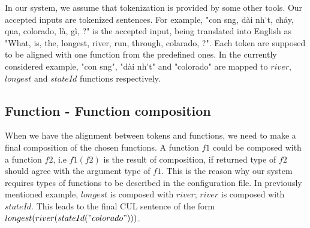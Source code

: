 In our system, we assume that tokenization is provided by some other tools. Our accepted inputs are tokenized sentences. For example, "{\selectfont con s\ocircumflex ng, d\`ai nh\'\acircumflex t, ch\h{a}y, qua, colorado, l\`a, g\`i, ?}" is the accepted input, being translated into English as "What, is, the, longest, river, run, through, colarado, ?". Each token are supposed to be aligned with one function from the predefined ones. In the currently considered example, "{\selectfont con s\ocircumflex ng", "d\`ai nh\'\acircumflex t" and "colorado"} are mapped to $river$, $longest$ and $stateId$ functions respectively. 

\subsection{Function - Function composition}
When we have the alignment between tokens and functions, we need to make a final composition of the chosen functions. A function $f1$ could be composed with a function $f2$, i.e $f1(f2)$ is the result of composition, if returned type of $f2$ should agree with the argument type of $f1$. This is the reason why our system requires types of functions to be described in the configuration file. In previously mentioned example, $longest$ is composed with $river$; $river$ is composed with $stateId$. This leads to the final CUL sentence of the form $longest(river(stateId("colorado")))$.